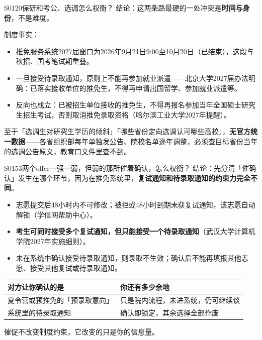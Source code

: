 \begin{qa}{S0120}{保研和考公、选调怎么权衡？}
结论：这两条路最硬的一处冲突是\textbf{时间与身份}，不是难度。

制度事实：
\begin{itemize}
  \item 推免服务系统2027届窗口为2026年9月21日9:00至10月20日（已结束），这段与秋招、国考笔试期重叠。
  \item 一旦接受待录取通知，原则上不能再参加就业派遣——北京大学2027届办法明确：已落实接收单位的推免生，不得再申请出国留学、参加就业派遣等。
  \item 反向也成立：已被招生单位接收的推免生，不得再报名参加当年全国硕士研究生招生考试，否则取消推免录取资格（哈尔滨工业大学2027年提醒）。
\end{itemize}

至于「选调生对研究生学历的倾斜」「哪些省份定向选调认可哪些高校」，\textbf{无官方统一数据}——各省组织部每年单独发公告、院校名单逐年调整，必须查目标省份当年的选调公告原文，教育口文件里查不到。
\end{qa}

\begin{qa}{S0153}{两个offer一强一弱，但弱的那所催着确认，怎么权衡？}
结论：先分清「催确认」发生在哪个环节，因为在推免系统里，\textbf{复试通知和待录取通知的约束力完全不同}。

\begin{itemize}
  \item 志愿提交后48小时内不可修改；被拒或48小时到期未获复试通知，该志愿自动解锁（学信网帮助中心）。
  \item \textbf{考生可同时接受多个复试通知，但只能接受一个待录取通知}（武汉大学计算机学院2027年实施细则）。
  \item 未在系统中确认接受待录取通知，则录取不生效；确认后不能再填报其他志愿、接受其他复试或待录取通知。
\end{itemize}

\par\vspace{2pt}\nobreak\begin{center}\footnotesize
\begin{tabularx}{\textwidth}{>{\raggedright\arraybackslash}X>{\raggedright\arraybackslash}X}
\toprule
\textbf{对方让你确认的是} & \textbf{你还有多少余地} \\ \midrule
夏令营或预推免的「预录取意向」 & 只是院内流程，未进系统，仍可继续谈 \\
系统里的待录取通知 & 确认即锁定，其余选择全部作废 \\
\bottomrule
\end{tabularx}
\end{center}\vspace{2pt}\par

催促不改变制度约束，它改变的只是你的信息量。
\end{qa}

